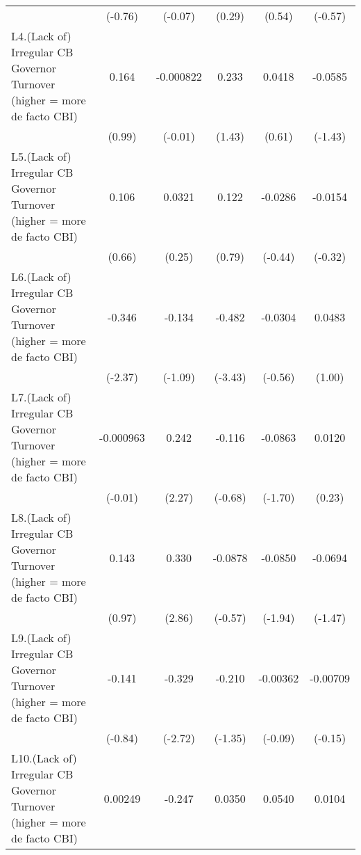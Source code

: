 {\begin{longtable}{l*{5}{c}}
                &  (-0.76)         &  (-0.07)         &   (0.29)         &   (0.54)         &  (-0.57)         \\
\addlinespace
L4.(Lack of) Irregular CB Governor Turnover (higher = more de facto CBI)&    0.164         &-0.000822         &    0.233         &   0.0418         &  -0.0585         \\
                &   (0.99)         &  (-0.01)         &   (1.43)         &   (0.61)         &  (-1.43)         \\
\addlinespace
L5.(Lack of) Irregular CB Governor Turnover (higher = more de facto CBI)&    0.106         &   0.0321         &    0.122         &  -0.0286         &  -0.0154         \\
                &   (0.66)         &   (0.25)         &   (0.79)         &  (-0.44)         &  (-0.32)         \\
\addlinespace
L6.(Lack of) Irregular CB Governor Turnover (higher = more de facto CBI)&   -0.346\sym{*}  &   -0.134         &   -0.482\sym{***}&  -0.0304         &   0.0483         \\
                &  (-2.37)         &  (-1.09)         &  (-3.43)         &  (-0.56)         &   (1.00)         \\
\addlinespace
L7.(Lack of) Irregular CB Governor Turnover (higher = more de facto CBI)&-0.000963         &    0.242\sym{*}  &   -0.116         &  -0.0863         &   0.0120         \\
                &  (-0.01)         &   (2.27)         &  (-0.68)         &  (-1.70)         &   (0.23)         \\
\addlinespace
L8.(Lack of) Irregular CB Governor Turnover (higher = more de facto CBI)&    0.143         &    0.330\sym{**} &  -0.0878         &  -0.0850         &  -0.0694         \\
                &   (0.97)         &   (2.86)         &  (-0.57)         &  (-1.94)         &  (-1.47)         \\
\addlinespace
L9.(Lack of) Irregular CB Governor Turnover (higher = more de facto CBI)&   -0.141         &   -0.329\sym{**} &   -0.210         & -0.00362         & -0.00709         \\
                &  (-0.84)         &  (-2.72)         &  (-1.35)         &  (-0.09)         &  (-0.15)         \\
\addlinespace
L10.(Lack of) Irregular CB Governor Turnover (higher = more de facto CBI)&  0.00249         &   -0.247\sym{*}  &   0.0350         &   0.0540         &   0.0104         \\

\end{longtable}}
